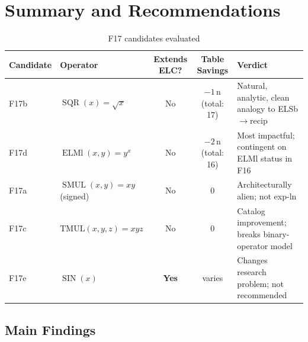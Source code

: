 \documentclass[12pt,a4paper]{article}
\theoremstyle{definition}
\theoremstyle{remark}
\newcommand{\ELMl}{\operatorname{ELMl}}
\newcommand{\SQR}{\operatorname{SQR}}
\newcommand{\SMUL}{\operatorname{SMUL}}
\newcommand{\SIN}{\operatorname{SIN}}
\begin{document}
\section{Summary and Recommendations}
\label{sec:summary}

\begin{table}[h]
\centering
\caption{F17 candidates evaluated}
\label{tab:candidates}
\begin{tabular}{@{}p{3cm}p{2.8cm}ccp{3.5cm}@{}}
\toprule
\textbf{Candidate} & \textbf{Operator} & \textbf{Extends ELC?} &
  \textbf{Table Savings} & \textbf{Verdict} \\
\midrule
F17b & $\SQR(x) = \sqrt{x}$ & No & $-1\,\text{n}$ (total: 17) &
  Natural, analytic, clean analogy to ELSb$\to$recip \\[4pt]
F17d & $\ELMl(x,y) = y^x$ & No & $-2\,\text{n}$ (total: 16) &
  Most impactful; contingent on ELMl status in F16 \\[4pt]
F17a & $\SMUL(x,y) = xy$ (signed) & No & $0$ &
  Architecturally alien; not exp-ln \\[4pt]
F17c & $\mathrm{TMUL}(x,y,z) = xyz$ & No & $0$ &
  Catalog improvement; breaks binary-operator model \\[4pt]
F17e & $\SIN(x)$ & \textbf{Yes} & varies &
  Changes research problem; not recommended \\
\bottomrule
\end{tabular}
\end{table}

\subsection{Main Findings}
\end{document}
